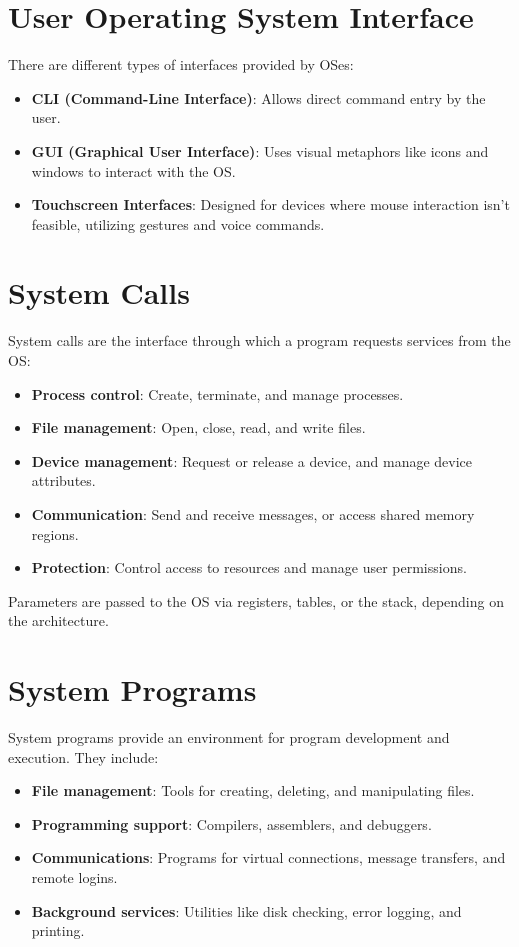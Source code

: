 \documentclass{article}
\begin{document}
\section{User Operating System Interface}
There are different types of interfaces provided by OSes:
\begin{itemize}
    \item \textbf{CLI (Command-Line Interface)}: Allows direct command entry by the user.
    \item \textbf{GUI (Graphical User Interface)}: Uses visual metaphors like icons and windows to interact with the OS.
    \item \textbf{Touchscreen Interfaces}: Designed for devices where mouse interaction isn't feasible, utilizing gestures and voice commands.
\end{itemize}

\section{System Calls}
System calls are the interface through which a program requests services from the OS:
\begin{itemize}
    \item \textbf{Process control}: Create, terminate, and manage processes.
    \item \textbf{File management}: Open, close, read, and write files.
    \item \textbf{Device management}: Request or release a device, and manage device attributes.
    \item \textbf{Communication}: Send and receive messages, or access shared memory regions.
    \item \textbf{Protection}: Control access to resources and manage user permissions.
\end{itemize}
Parameters are passed to the OS via registers, tables, or the stack, depending on the architecture.

\section{System Programs}
System programs provide an environment for program development and execution. They include:
\begin{itemize}
    \item \textbf{File management}: Tools for creating, deleting, and manipulating files.
    \item \textbf{Programming support}: Compilers, assemblers, and debuggers.
    \item \textbf{Communications}: Programs for virtual connections, message transfers, and remote logins.
    \item \textbf{Background services}: Utilities like disk checking, error logging, and printing.
\end{itemize}
\end{document}
